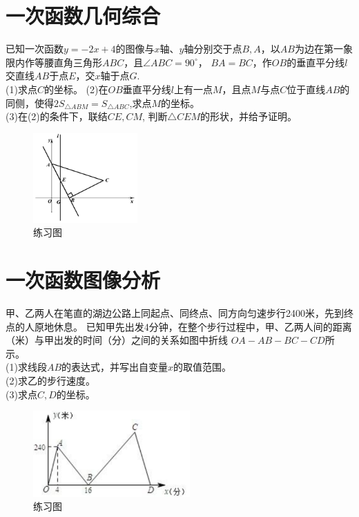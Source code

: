 \documentclass{ecnuthesis}
\begin{document}
\section{一次函数几何综合}
\begin{problem}
    已知一次函数$y=-2x+4$的图像与$x$轴、$y$轴分别交于点$B,A$，以$AB$为边在第一象限内作等腰直角三角形$ABC$，且$\angle ABC=90^\circ$，
    $BA=BC$，作$OB$的垂直平分线$l$交直线$AB$于点$E$，交$x$轴于点$G$. \\
    (1)求点$C$的坐标。
    (2)在$OB$垂直平分线$l$上有一点$M$，且点$M$与点$C$位于直线$AB$的同侧，使得$2S_{\triangle ABM}=S_{\triangle ABC}$,求点$M$的坐标。\\
    (3)在(2)的条件下，联结$CE,CM$, 判断$\triangle CEM$的形状，并给予证明。
\end{problem}
\begin{figure}[H]
\centering
\includegraphics[width=4cm]{picture/401.png}
\caption{练习图}
\end{figure}
\clearpage
\section{一次函数图像分析}
\begin{problem}
    甲、乙两人在笔直的湖边公路上同起点、同终点、同方向匀速步行2400米，先到终点的人原地休息。
    已知甲先出发4分钟，在整个步行过程中，甲、乙两人间的距离（米）与甲出发的时间（分）之间的关系如图中折线
    $OA-AB-BC-CD$所示。\\
    (1)求线段$AB$的表达式，并写出自变量$x$的取值范围。 \\
    (2)求乙的步行速度。 \\
    (3)求点$C,D$的坐标。
\end{problem}
\begin{figure}[H]
\centering
\includegraphics[width=6cm]{picture/6122.png}
\caption{练习图}
\end{figure}
\clearpage
\end{document}
